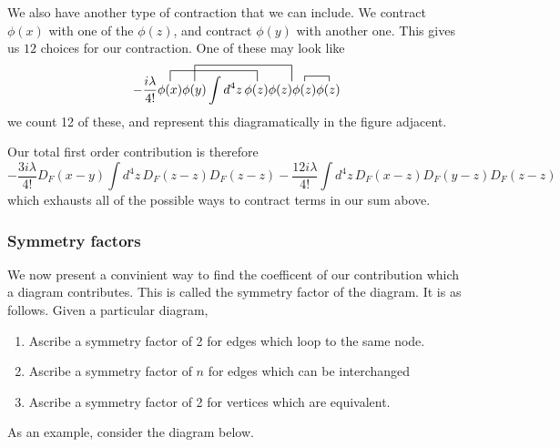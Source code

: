 \documentclass[11pt, oneside]{article}   	%
\theoremstyle{newline}
\theoremstyle{newline}
\theoremstyle{newline}
\theoremstyle{newline}
\theoremstyle{newline}
\begin{document}
\begin{figure}[!h] 
\centering
{}  
\end{figure} 

We also have another type of contraction that we can include. We contract $\phi(x)$ with one of the $\phi(z)$, and contract $\phi(y) $ with another one. This gives us $12$ choices for our contraction. One of these may look like \[  - \frac{i \lambda}{ 4!} \contraction[2ex]{}{\phi(x) } {\phi(y) \int d^4 z \, }{ \phi(z) } \contraction[3ex]{ \phi(x) } { \phi(y) } { \int d^4 z \, phi(z ) }{\phi(z)} \phi(x) \phi(y ) \int d^4 z \, \phi(z) \phi(z) \contraction{}{\phi(z)} {} {\phi(z)} \phi(z) \phi(z)  \] we count 12 of these, and represent this diagramatically in the figure adjacent.  
\begin{figure}[!h] 
\centering
{}
\end{figure} 
Our total first order contribution is therefore \[ - \frac{ 3i\lambda }{ 4!} D_F(x - y )  \int d^4 z \, D_F(z - z)  D_F(z - z) - \frac{12 i \lambda}{ 4! } \int d^4 z \, D_F( x - z) D_F( y - z) D_F( z - z ) \] which exhausts all of the possible ways to contract terms in our sum above. 

\subsubsection{Symmetry factors} 
We now present a convinient way to find the coefficent of our contribution which a diagram contributes. This is called the symmetry factor of the diagram. It is as follows. Given a particular diagram, 
\begin{enumerate} 
\item Ascribe a symmetry factor of 2 for edges which loop to the same node. 
\item Ascribe a symmetry factor of $n$ for edges which can be interchanged
\item Ascribe a symmetry factor of 2 for vertices which are equivalent. 
\end{enumerate}
As an example, consider the diagram below. 
\end{document}
